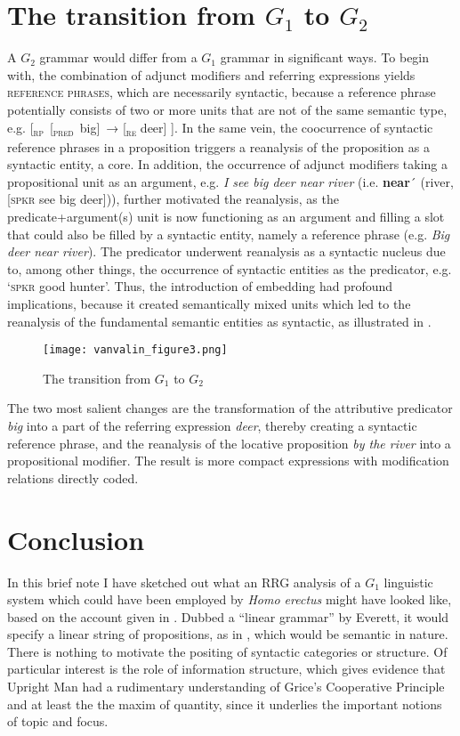 \documentclass[output=paper,colorlinks,citecolor=brown]{langscibook}
\begin{document}
\section{The transition from $G_1$ to $G_2$}\label{sec:vanvalin:5}

A $G_2$ grammar would differ from a $G_1$ grammar in significant ways.  To begin with, the combination of adjunct modifiers and referring expressions yields \textsc{reference phrases}, which are necessarily syntactic, because a reference phrase potentially consists of two or more units that are not of the same semantic type, e.g. [\textsubscript{\scshape rp}~[\textsubscript{\scshape pred}~big]~→ [\textsubscript{\scshape re} deer] ].  In the same vein, the coocurrence of syntactic reference phrases in a proposition triggers a reanalysis of the proposition as a syntactic entity, a core.  In addition, the occurrence of adjunct modifiers taking a propositional unit as an argument, e.g. \textit{I see big deer near river} (i.e. \textbf{near}´ (river, [\textsc{spkr} see big deer])), further motivated the reanalysis, as the predicate+argument(s) unit is now functioning as an argument and filling a slot that could also be filled by a syntactic entity, namely a reference phrase (e.g. \textit{Big deer near river}).  The predicator underwent reanalysis as a syntactic nucleus due to, among other things, the occurrence of syntactic entities as the predicator, e.g. ‘\textsc{spkr} good hunter’.  Thus, the introduction of embedding had profound implications, because it created semantically mixed units which led to the reanalysis of the fundamental semantic entities as syntactic, as illustrated in .

\begin{figure}
\centering
\texttt{[image: vanvalin\_figure3.png]}
\caption{\label{fig:fig3}The transition from $G_1$ to $G_2$}
\end{figure}

The two most salient changes are the transformation of the attributive predicator \textit{big} into a part of the referring expression \emph{deer}, thereby creating a syntactic reference phrase, and the reanalysis of the locative proposition \emph{by the river} into a propositional modifier.  The result is more compact expressions with modification relations directly coded.  

\section{Conclusion}\label{sec:vanvalin:6}
In this brief note I have sketched out what an RRG analysis of a $G_1$ linguistic system which could have been employed by \emph{Homo erectus} might have looked like, based on the account given in \citet{everett2017language}.  Dubbed a “linear grammar” by Everett, it would specify a linear string of propositions, as in , which would be semantic in nature.  There is nothing to motivate the positing of syntactic categories or structure.  Of particular interest is the role of information structure, which gives evidence that Upright Man had a rudimentary understanding of Grice’s Cooperative Principle and at least the the maxim of quantity, since it underlies the important notions of topic and focus.  
\end{document}
